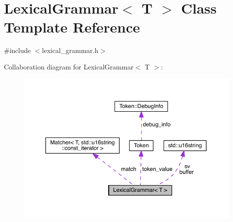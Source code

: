 \hypertarget{class_lexical_grammar}{}\section{Lexical\+Grammar$<$ T $>$ Class Template Reference}
\label{class_lexical_grammar}


{\ttfamily \#include $<$lexical\+\_\+grammar.\+h$>$}



Collaboration diagram for Lexical\+Grammar$<$ T $>$\+:
\nopagebreak
\begin{figure}[H]
\begin{center}
\leavevmode
\includegraphics[width=350pt]{class_lexical_grammar__coll__graph}
\end{center}
\end{figure}
